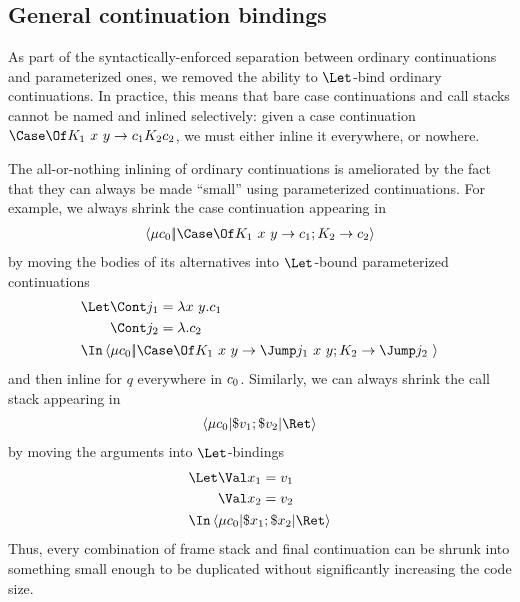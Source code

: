\documentclass{article}
\begin{document}
\subsection{General continuation bindings}

As part of the syntactically-enforced separation between ordinary continuations
and parameterized ones, we removed the ability to $\Let$-bind ordinary
continuations.  In practice, this means that bare case continuations and call
stacks cannot be named and inlined selectively: given a case continuation
$\Case\Of\alt{K_1 ~ x ~ y}{\cmd_1}{K_2}{\cmd_2}$, we must either inline it
everywhere, or nowhere.

The all-or-nothing inlining of ordinary continuations is ameliorated by the fact
that they can always be made ``small'' using parameterized continuations.  For
example, we always shrink the case continuation appearing in
\begin{align*}
  \cut{\comp{q}\cmd_0}{\Case\Of\alt{K_1 ~ x ~ y}{\cmd_1};\alt{K_2}{\cmd_2}}
\end{align*}
by moving the bodies of its alternatives into $\Let$-bound parameterized
continuations
\begin{align*}
  &\Let
    \begin{aligned}[t]
      \Cont j_1 &= \fnk{x ~ y} \cmd_1
      \\
      \Cont j_2 &= \fnk{} \cmd_2
    \end{aligned}
  \\
  &\In
    \cut{\comp{q}\cmd_0}{\Case\Of\alt{K_1 ~ x ~ y}{\jump{x~y}{j_1}};\alt{K_2}{\jump{}{j_2}}}
\end{align*}
and then inline for $q$ everywhere in $c_0$.  Similarly, we can always shrink
the call stack appearing in
\begin{align*}
  \braket{\comp{q}\cmd_0 | \appto{\tm_1} \then \appto{\tm_2} | \ret r}
\end{align*}
by moving the arguments into $\Let$-bindings
\begin{align*}
  &\Let
    \begin{aligned}[t]
      \Val x_1 &= \tm_1
      \\
      \Val x_2 &= \tm_2
    \end{aligned}
  \\
  &\In
    \braket{\comp{q}\cmd_0 | \appto{x_1} \then \appto{x_2} | \ret q}
\end{align*}
Thus, every combination of frame stack and final continuation can be shrunk into
something small enough to be duplicated without significantly increasing the
code size.
\end{document}
